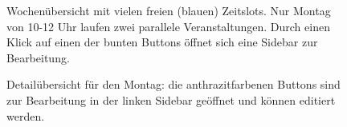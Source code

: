\documentclass{swp1}
\begin{document}
\begin{figure}
\caption{Wochenübersicht mit vielen freien (blauen) Zeitslots. Nur Montag von 10-12 Uhr laufen zwei parallele Veranstaltungen. Durch einen Klick auf einen der bunten Buttons öffnet sich eine Sidebar zur Bearbeitung.}
\label{ab2}
\end{figure}

\begin{figure}
\caption{Detailübersicht für den Montag: die anthrazitfarbenen Buttons sind zur Bearbeitung in der linken Sidebar geöffnet und können editiert werden. }
\label{ab3}
\end{figure}
\end{document}

